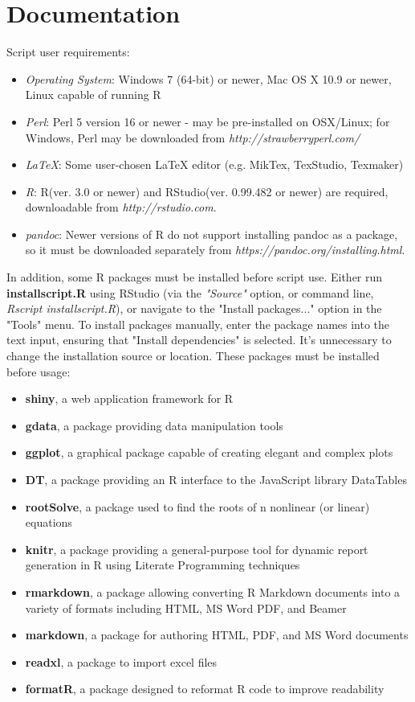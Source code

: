 \documentclass[conference]{IEEEtran}
\begin{document}
\section*{Documentation}\label{sec:Documentation}
Script user requirements:
\begin{itemize}
  \item {\textit{Operating System}: Windows 7 (64-bit) or newer, Mac OS X 10.9 or newer, Linux capable of running R}
  \item {\textit{Perl}: Perl 5 version 16 or newer - may be pre-installed on OSX/Linux; for Windows, Perl may be downloaded from \textit{http://strawberryperl.com/}}
  \item{\textit{LaTeX}: Some user-chosen LaTeX editor (e.g. MikTex, TexStudio, Texmaker)}
  \item {\textit{R}: R(ver. 3.0 or newer) and RStudio(ver. 0.99.482 or newer) are required, downloadable from \textit{http://rstudio.com}}.
   \item{\textit{pandoc}: Newer versions of R do not support installing pandoc as a package, so it must be downloaded separately from \textit{https://pandoc.org/installing.html}.}
\end{itemize}
In addition, some R packages must be installed before script use. Either run \textbf{installscript.R} using RStudio (via the \textit{"Source"} option, or command line, \textit{Rscript installscript.R}), or navigate to the "Install packages..." option in the "Tools" menu. To install packages manually, enter the package names into the text input, ensuring that "Install dependencies" is selected. It's unnecessary to change the installation source or location. These packages must be installed before usage:
\begin{itemize}
	\item {\textbf{shiny}, a web application framework for R}
	\item {\textbf{gdata}, a package providing data manipulation tools}
	\item {\textbf{ggplot}, a graphical package capable of creating elegant and complex plots}
	\item {\textbf{DT}, a package providing an R interface to the JavaScript library DataTables}
	\item {\textbf{rootSolve}, a package used to find the roots of n nonlinear (or linear) equations}
	\item {\textbf{knitr}, a package providing a general-purpose tool for dynamic report generation in R using Literate Programming techniques}
	\item {\textbf{rmarkdown}, a package allowing converting R Markdown documents into a variety of formats including HTML, MS Word PDF, and Beamer}
	\item {\textbf{markdown}, a package for authoring HTML, PDF, and MS Word documents}
	\item {\textbf{readxl}, a package to import excel files}
	\item {\textbf{formatR}, a package designed to reformat R code to improve readability}
 \end{itemize}
\end{document}
